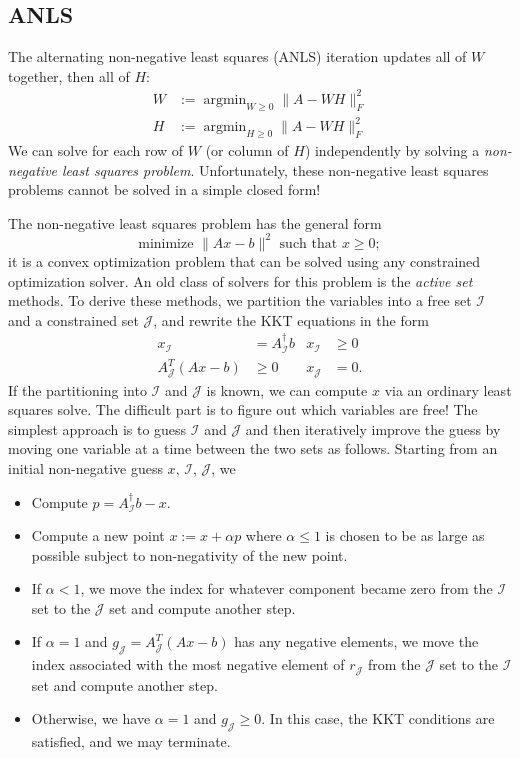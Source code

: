 \documentclass[12pt, leqno]{article} %
\begin{document}
\subsection{ANLS}

The alternating non-negative least squares (ANLS) iteration updates
all of $W$ together, then all of $H$:
\begin{align*}
  W & := \operatorname{argmin}_{W \geq 0} \|A-WH\|_F^2 \\
  H & := \operatorname{argmin}_{H \geq 0} \|A-WH\|_F^2
\end{align*}
We can solve for each row of $W$ (or column of $H$) independently by
solving a {\em non-negative least squares problem}.  Unfortunately,
these non-negative least squares problems cannot be solved in a
simple closed form!

The non-negative least squares problem has the general form
\[
  \mbox{minimize } \|Ax-b\|^2 \mbox{ such that } x \geq 0;
\]
it is a convex optimization problem that can be solved using any
constrained optimization solver.  An old class of solvers for this
problem is the {\em active set} methods.  To derive these methods,
we partition the variables into a free set $\mathcal{I}$ and a
constrained set $\mathcal{J}$, and rewrite the KKT equations in the form
\begin{align*}
  x_{\mathcal{I}} &= A_{\mathcal{I}}^\dagger b &
  x_{\mathcal{I}} & \geq 0 \\
  A_{\mathcal{J}}^T (Ax-b) & \geq 0 &
  x_{\mathcal{J}} & = 0.
\end{align*}
If the partitioning into $\mathcal{I}$ and $\mathcal{J}$ is known,
we can compute $x$ via an ordinary least squares solve.  The
difficult part is to figure out which variables are free!
The simplest approach is to guess $\mathcal{I}$ and $\mathcal{J}$
and then iteratively improve the guess by moving one variable at a
time between the two sets as follows.  Starting from an initial
non-negative guess $x$, $\mathcal{I}$, $\mathcal{J}$, we
\begin{itemize}
\item Compute $p = A_{\mathcal{I}}^\dagger b - x$.
\item Compute a new point $x := x + \alpha p$ where $\alpha \leq 1$
  is chosen to be as large as possible subject to non-negativity of
  the new point.
\item If $\alpha < 1$, we move the index for whatever component became
  zero from the $\mathcal{I}$ set to the $\mathcal{J}$ set and
  compute another step.
\item If $\alpha = 1$ and $g_{\mathcal{J}} = A_{\mathcal{J}}^T (Ax-b)$
  has any negative elements, we move the index associated with the
  most negative element of $r_{\mathcal{J}}$ from the $\mathcal{J}$
  set to the $\mathcal{I}$ set and compute another step.
\item Otherwise, we have $\alpha = 1$ and $g_{\mathcal{J}} \geq 0$.
  In this case, the KKT conditions are satisfied, and we may
  terminate.
\end{itemize}
\end{document}
